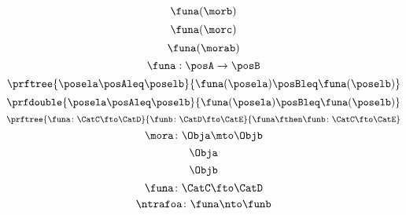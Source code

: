 {\begin{forslides}
        \begin{equation}
            \label{eq:slides_Fg}
            \funa(\morb)
        \end{equation}
        \begin{equation}
            \label{eq:slides_Fh}
            \funa(\morc)
        \end{equation}
        \begin{equation}
            \label{eq:slides_Ffg}
            \funa(\morab)
        \end{equation}
        \begin{equation}
            \label{eq:mono1}
            \funa: \posA \to \posB
        \end{equation}
        \begin{equation}
            \label{eq:mono2}
            \prftree{\posela \posAleq \poselb}{\funa(\posela) \posBleq \funa(\poselb)}
        \end{equation}
        \begin{equation}
            \label{eq:mono3}
            \prfdouble{\posela \posAleq \poselb}{\funa(\posela) \posBleq \funa(\poselb)}
        \end{equation}
        \begin{equation}
            \label{eq:functor-composition1}
            \prftree{\funa\colon \CatC \fto \CatD}{\funb\colon\CatD\fto\CatE}{\funa\fthen\funb\colon \CatC \fto \CatE}
        \end{equation}
        \begin{equation}
            \label{eq:slides_mora}
            \mora\colon \Obja\mto\Objb
        \end{equation}
        \begin{equation}
            \label{eq:slides_mora_obja}
            \Obja
        \end{equation}
        \begin{equation}
            \label{eq:slides_mora_objb}
            \Objb
        \end{equation}
        \begin{equation}
            \label{eq:slides_funa}
            \funa\colon\CatC\fto\CatD
        \end{equation}
        \begin{equation}
            \label{eq:slides_ntrafoa}
            \ntrafoa\colon\funa\nto\funb
        \end{equation}
        \begin{equation}
            \label{eq:slides_hom}

\end{equation}
\end{forslides}}
